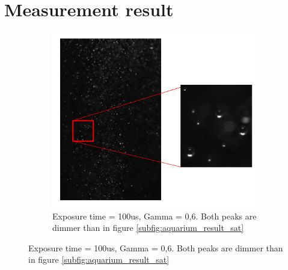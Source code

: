 		
		
	\section{Measurement result}\label{measurement_results}
		\begin{figure}			
			\begin{subfigure}[b]{.55\textwidth}
				\centering
				\includegraphics[scale=0.8]{images/aquarium_result_sat.png}
				\caption{Exposure time = 100us, Gamma = 0,6. Both peaks are dimmer than in figure \ref{subfig:aquarium_result_sat}}
			\end{subfigure}
			

\end{figure}
